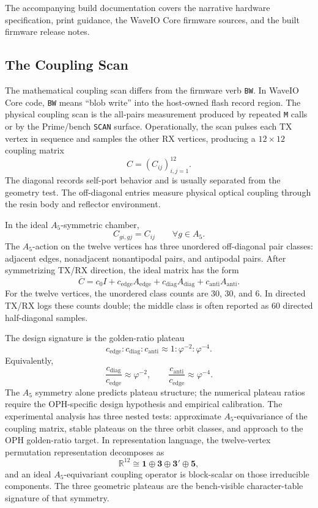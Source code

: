 \documentclass[11pt]{article}
\theoremstyle{remark}
\theoremstyle{plain}
\newcommand{\R}{\mathbb R}
\newcommand{\diag}{\mathrm{diag}}
\newcommand{\anti}{\mathrm{anti}}
\begin{document}
The accompanying build documentation covers the narrative hardware
specification, print guidance, the WaveIO Core firmware sources, and the built
firmware release notes.

\subsection{The Coupling Scan}

The mathematical coupling scan differs from the firmware verb \texttt{BW}. In WaveIO Core code, \texttt{BW} means ``blob write'' into the host-owned flash record region. The physical coupling scan is the all-pairs measurement produced by repeated \texttt{M} calls or by the Prime/bench \texttt{SCAN} surface. Operationally, the scan pulses each TX vertex in sequence and samples the other RX vertices, producing a \(12\times12\) coupling matrix
\[
C=(C_{ij})_{i,j=1}^{12}.
\]
The diagonal records self-port behavior and is usually separated from the geometry test. The off-diagonal entries measure physical optical coupling through the resin body and reflector environment.

In the ideal \(A_5\)-symmetric chamber,
\[
C_{g i,g j}=C_{ij}
\qquad
\forall g\in A_5.
\]
The \(A_5\)-action on the twelve vertices has three unordered off-diagonal pair classes: adjacent edges, nonadjacent nonantipodal pairs, and antipodal pairs. After symmetrizing TX/RX direction, the ideal matrix has the form
\[
\overline C
=
c_0 I+c_{\mathrm{edge}}A_{\mathrm{edge}}
+c_{\diag}A_{\diag}
+c_{\anti}A_{\anti}.
\]
For the twelve vertices, the unordered class counts are \(30\), \(30\), and \(6\). In directed TX/RX logs these counts double; the middle class is often reported as \(60\) directed half-diagonal samples.

The design signature is the golden-ratio plateau
\[
\boxed{
c_{\mathrm{edge}}:c_{\diag}:c_{\anti}
\approx
1:\varphi^{-2}:\varphi^{-4}.
}
\]
Equivalently,
\[
\frac{c_{\diag}}{c_{\mathrm{edge}}}\approx\varphi^{-2},
\qquad
\frac{c_{\anti}}{c_{\mathrm{edge}}}\approx\varphi^{-4}.
\]
The \(A_5\) symmetry alone predicts plateau structure; the numerical plateau ratios require the OPH-specific design hypothesis and empirical calibration. The experimental analysis has three nested tests: approximate \(A_5\)-equivariance of the coupling matrix, stable plateaus on the three orbit classes, and approach to the OPH golden-ratio target. In representation language, the twelve-vertex permutation representation decomposes as
\[
\R^{12}\cong \mathbf 1\oplus \mathbf 3\oplus \mathbf 3'\oplus \mathbf 5,
\]
and an ideal \(A_5\)-equivariant coupling operator is block-scalar on those irreducible components. The three geometric plateaus are the bench-visible character-table signature of that symmetry.
\end{document}
